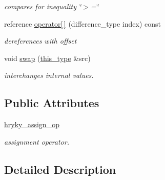 \begin{DoxyCompactItemize}
\begin{DoxyCompactList}\small\item\em compares for inequality \char`\"{}$>$=\char`\"{} \end{DoxyCompactList}\item 
\hypertarget{classhryky_1_1iterator_1_1random_1_1_base_a6988b0fcaf2cd0113ff4ae48de9aafb9}{reference \hyperlink{classhryky_1_1iterator_1_1random_1_1_base_a6988b0fcaf2cd0113ff4ae48de9aafb9}{operator\mbox{[}$\,$\mbox{]}} (difference\-\_\-type index) const}\label{classhryky_1_1iterator_1_1random_1_1_base_a6988b0fcaf2cd0113ff4ae48de9aafb9}

\begin{DoxyCompactList}\small\item\em dereferences with offset \end{DoxyCompactList}\item 
\hypertarget{classhryky_1_1iterator_1_1random_1_1_base_acc5694bc21edc91c97d8b55d80b6f110}{void \hyperlink{classhryky_1_1iterator_1_1random_1_1_base_acc5694bc21edc91c97d8b55d80b6f110}{swap} (\hyperlink{classhryky_1_1iterator_1_1random_1_1_immutable}{this\-\_\-type} \&src)}\label{classhryky_1_1iterator_1_1random_1_1_base_acc5694bc21edc91c97d8b55d80b6f110}

\begin{DoxyCompactList}\small\item\em interchanges internal values. \end{DoxyCompactList}\end{DoxyCompactItemize}
\subsection*{Public Attributes}
\begin{DoxyCompactItemize}
\item 
\hypertarget{classhryky_1_1iterator_1_1random_1_1_base_a3fc3be5c70c5f2e46d4494c3dbf40598}{\hyperlink{classhryky_1_1iterator_1_1random_1_1_base_a3fc3be5c70c5f2e46d4494c3dbf40598}{hryky\-\_\-assign\-\_\-op}}\label{classhryky_1_1iterator_1_1random_1_1_base_a3fc3be5c70c5f2e46d4494c3dbf40598}

\begin{DoxyCompactList}\small\item\em assignment operator. \end{DoxyCompactList}\end{DoxyCompactItemize}


\subsection{Detailed Description}
